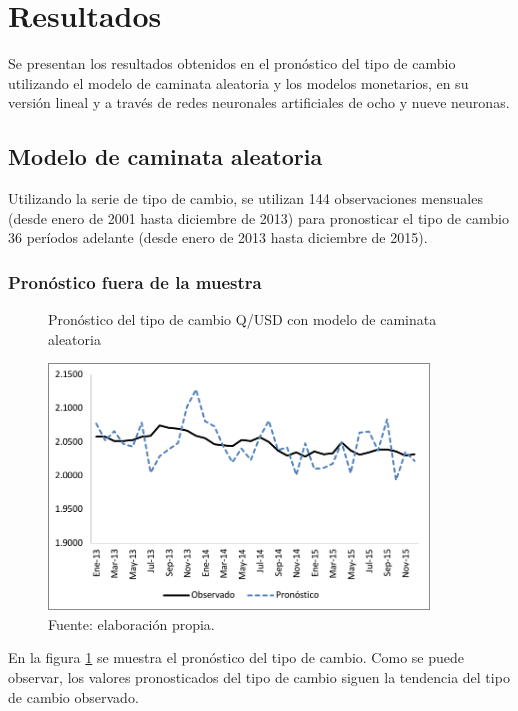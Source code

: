 \section{Resultados}

Se presentan los resultados obtenidos en el pronóstico del tipo de cambio utilizando el modelo de caminata aleatoria y los modelos monetarios, en su versión lineal y a través de redes neuronales artificiales de ocho y nueve neuronas.

\subsection{Modelo de caminata aleatoria}
Utilizando la serie de tipo de cambio, se utilizan 144 observaciones mensuales (desde enero de 2001 hasta diciembre de 2013) para pronosticar el tipo de cambio 36 períodos adelante (desde enero de 2013 hasta diciembre de 2015).

\subsubsection{Pronóstico fuera de la muestra}

\begin{figure}[htb]
	\centering
	\caption{Pronóstico del tipo de cambio Q/USD con modelo de caminata aleatoria}
	\label{fig:rwout}
	\includegraphics[width=0.9\textwidth]{figuras/RW_out.png}
	\caption*{Fuente: elaboración propia.}
\end{figure}

\clearpage
En la figura \ref{fig:rwout} se muestra el pronóstico del tipo de cambio. Como se puede observar, los valores pronosticados del tipo de cambio siguen la tendencia del tipo de cambio observado.\\


